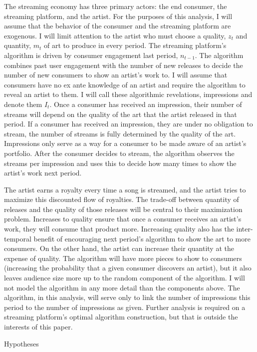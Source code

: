 \documentclass[
]{article}
\begin{document}
The streaming economy has three primary actors: the end consumer, the
streaming platform, and the artist. For the purposes of this analysis, I
will assume that the behavior of the consumer and the streaming platform
are exogenous. I will limit attention to the artist who must choose a
quality, \(z_t\) and quantity, \(m_t\) of art to produce in every
period. The streaming platform's algorithm is driven by consumer
engagement last period, \(n_{t-1}\). The algorithm combines past user
engagement with the number of new releases to decide the number of new
consumers to show an artist's work to. I will assume that consumers have
no ex ante knowledge of an artist and require the algorithm to reveal an
artist to them. I will call these algorithmic revelations, impressions
and denote them \(I_t\). Once a consumer has received an impression,
their number of streams will depend on the quality of the art that the
artist released in that period. If a consumer has received an
impression, they are under no obligation to stream, the number of
streams is fully determined by the quality of the art. Impressions only
serve as a way for a consumer to be made aware of an artist's portfolio.
After the consumer decides to stream, the algorithm observes the streams
per impression and uses this to decide how many times to show the
artist's work next period.

The artist earns a royalty every time a song is streamed, and the artist
tries to maximize this discounted flow of royalties. The trade-off
between quantity of releases and the quality of those releases will be
central to their maximization problem. Increases to quality ensure that
once a consumer receives an artist's work, they will consume that
product more. Increasing quality also has the inter-temporal benefit of
encouraging next period's algorithm to show the art to more consumers.
On the other hand, the artist can increase their quantity at the expense
of quality. The algorithm will have more pieces to show to consumers
(increasing the probability that a given consumer discovers an artist),
but it also leaves audience size more up to the random component of the
algorithm. I will not model the algorithm in any more detail than the
components above. The algorithm, in this analysis, will serve only to
link the number of impressions this period to the number of impressions
as given. Further analysis is required on a streaming platform's optimal
algorithm construction, but that is outside the interests of this paper.

Hypotheses
\end{document}
